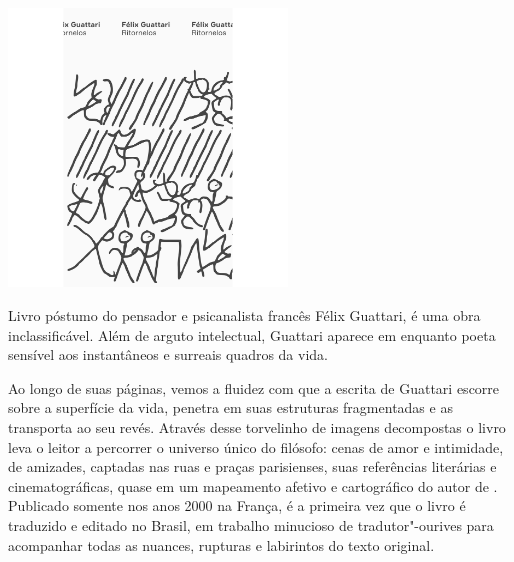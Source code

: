 \pagebreak %

\begin{center}
\hspace*{-3.6cm}
\hspace*{3.1cm}\includegraphics[width=74mm]{./grid/guattari.jpg}
\end{center}

\hspace*{-7cm}\hrulefill\hspace*{-7cm}

\medskip

\noindent{}Livro póstumo do pensador e psicanalista francês Félix Guattari, {} é uma obra inclassificável.  Além de arguto intelectual, Guattari aparece em {} enquanto poeta sensível aos instantâneos e surreais quadros da vida.

Ao longo de suas páginas, vemos a fluidez com que a escrita de Guattari escorre sobre a superfície da vida, penetra em suas estruturas fragmentadas e as transporta ao seu revés. Através desse torvelinho de imagens decompostas o livro leva o leitor a percorrer o universo único do filósofo: cenas de amor e intimidade, de amizades, captadas nas ruas e praças parisienses, suas referências literárias e cinematográficas, quase em um mapeamento afetivo e cartográfico do autor de {}. Publicado somente nos anos 2000 na França, é a primeira vez que o livro é traduzido e editado no Brasil, em trabalho minucioso de tradutor"-ourives para acompanhar todas as nuances, rupturas e labirintos do texto original.


